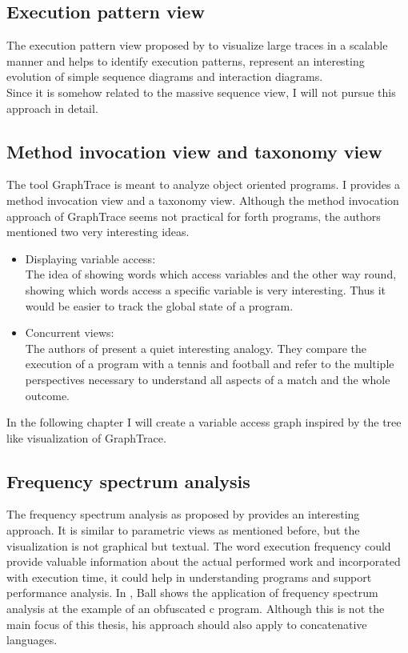 \subsection*{Execution pattern view}
The execution pattern view proposed by \cite{Pauw98executionpatterns} to visualize large traces in a scalable manner and helps to identify execution patterns, represent an interesting evolution of simple sequence diagrams and interaction diagrams.
\\
Since it is somehow related to the massive sequence view, I will not pursue this approach in detail.

\subsection*{Method invocation view and taxonomy view}
The tool \gls{GraphTrace}\cite{Kleyn:1988:GOS:62084.62101} is meant to analyze object oriented programs. I provides a method invocation view and a taxonomy view. Although the method invocation approach of GraphTrace seems not practical for forth programs, the authors mentioned two very interesting ideas.
\begin{itemize}
\item Displaying variable access:\\
	The idea of showing words which access variables and the other way round, showing which words access a specific variable is very interesting. Thus it would be easier to track the global state of a program.
\item Concurrent views:\\
	The authors of \cite{Kleyn:1988:GOS:62084.62101} present a quiet interesting analogy. They compare the execution of a program with a tennis and football and refer to the multiple perspectives necessary to understand all aspects of a match and the whole outcome.
\end{itemize}

In the following chapter I will create a variable access graph inspired by the tree like visualization of GraphTrace.

\subsection*{Frequency spectrum analysis}

The frequency spectrum analysis as proposed by \cite{Ball:1999:CDA:318774.318944} provides an interesting approach. It is similar to parametric views as mentioned before, but the visualization is not graphical but textual. The word execution frequency could provide valuable information about the actual performed work and incorporated with execution time, it could help in understanding programs and support performance analysis. In \cite{Ball:1999:CDA:318774.318944}, Ball shows the application of frequency spectrum analysis at the example of an obfuscated c program. Although this is not the main focus of this thesis, his approach should also apply to concatenative languages.

